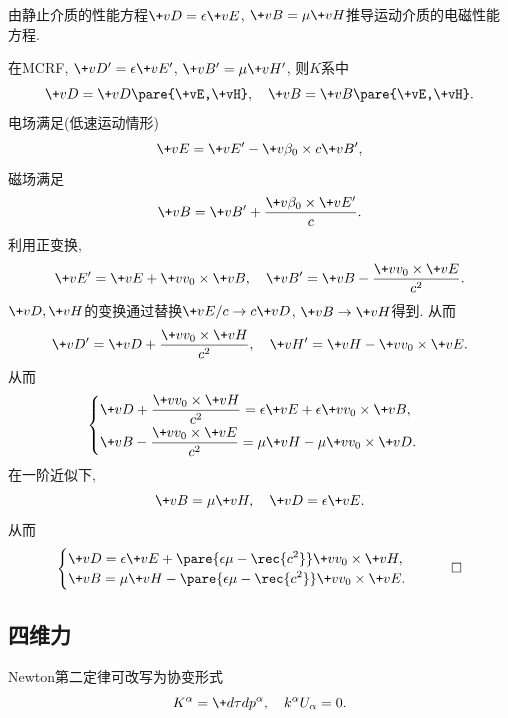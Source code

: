 \documentclass[hidelinks]{ctexart}
\begin{document}
\begin{sample}
    \begin{ex}
        由静止介质的性能方程$\+vD = \epsilon \+vE$, $\+vB = \mu \+vH$推导运动介质的电磁性能方程.
    \end{ex}
    \begin{solution}
        在MCRF, $\+vD' = \epsilon \+vE'$, $\+vB' = \mu \+vH'$, 则$K$系中
        \[ \+vD = \+vD\pare{\+vE,\+vH},\quad \+vB = \+vB\pare{\+vE,\+vH}. \]
        电场满足(低速运动情形)
        \[ \+vE = \+vE' - \+v\beta_0 \times c\+vB', \]
        磁场满足
        \[ \+vB = \+vB' + \frac{\+v\beta_0 \times \+vE'}{c}. \]
        利用正变换,
        \[ \+vE' = \+vE + \+vv_0 \times \+vB,\quad \+vB' = \+vB - \frac{\+vv_0 \times \+vE}{c^2}. \]
        $\+vD,\+vH$的变换通过替换$\+vE/c \rightarrow c\+vD$, $\+vB \rightarrow \+vH$得到. 从而
        \[ \+vD' = \+vD + \frac{\+vv_0 \times \+vH}{c^2},\quad \+vH' = \+vH - {\+vv_0 \times \+vE}. \]
        从而
        \[ \begin{cases}
            \displaystyle \+vD + \frac{\+vv_0 \times \+vH}{c^2} = \epsilon \+vE + \epsilon \+vv_0 \times \+vB, \\[.5em]
            \displaystyle \+vB - \frac{\+vv_0 \times \+vE}{c^2} = \mu \+vH - \mu \+vv_0 \times \+vD.
        \end{cases} \]
        在一阶近似下,
        \[ \+vB = \mu \+vH,\quad \+vD = \epsilon \+vE. \]
        从而
        \[ \begin{cases}
            \displaystyle \+vD = \epsilon \+vE + \pare{\epsilon \mu - \rec{c^2}} \+vv_0 \times \+vH, \\
            \displaystyle \+vB = \mu \+vH - \pare{\epsilon \mu -\rec{c^2}} \+vv_0 \times \+vE.
        \end{cases} \qedhere \]
    \end{solution}
\end{sample}



\subsection{四维力} %
\label{sub:四维力}

Newton第二定律可改写为协变形式
\[ K^\alpha = \+d\tau d{p^\alpha},\quad k^\alpha U_\alpha = 0. \]

\end{document}
